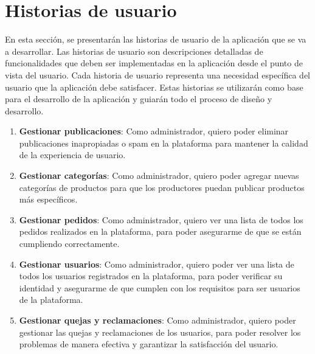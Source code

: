 
\section{Historias de usuario}\label{sec:historias-usuario}

En esta sección, se presentarán las historias de usuario de la aplicación que se va a desarrollar. Las historias de usuario son descripciones detalladas de funcionalidades que deben ser implementadas en la aplicación desde el punto de vista del usuario. Cada historia de usuario representa una necesidad específica del usuario que la aplicación debe satisfacer. Estas historias se utilizarán como base para el desarrollo de la aplicación y guiarán todo el proceso de diseño y desarrollo.

\begin{enumerate}[HU-1:]

\subsection{Administradores}

\item \textbf{Gestionar publicaciones}: Como administrador, quiero poder eliminar publicaciones inapropiadas o spam en la plataforma para mantener la calidad de la experiencia de usuario.

\item \textbf{Gestionar categorías}: Como administrador, quiero poder agregar nuevas categorías de productos para que los productores puedan publicar productos más específicos.

\item \textbf{Gestionar pedidos}: Como administrador, quiero ver una lista de todos los pedidos realizados en la plataforma, para poder asegurarme de que se están cumpliendo correctamente.

\item \textbf{Gestionar usuarios}: Como administrador, quiero poder ver una lista de todos los usuarios registrados en la plataforma, para poder verificar su identidad y asegurarme de que cumplen con los requisitos para ser usuarios de la plataforma.

\item \textbf{Gestionar quejas y reclamaciones}: Como administrador, quiero poder gestionar las quejas y reclamaciones de los usuarios, para poder resolver los problemas de manera efectiva y garantizar la satisfacción del usuario.


\end{enumerate}
